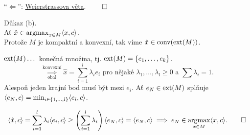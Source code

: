 \enquote{$\Leftarrow$}: \href{https://cs.wikipedia.org/wiki/Weierstrassova_v%C4%9Bta}{Weierstrassova věta}. $\qed$

Důkaz (b). \\ Ať $\hat x \in \operatorname*{argmax}_{x \in M} \langle x,c\rangle$. \\
Protože $M$ je kompaktní a konvexní, tak víme $\hat x \in \operatorname*{conv}(\operatorname*{ext}(M))$.

$\operatorname*{ext}(M) \dots$ konečná množina, tj. $\operatorname*{ext}(M) = \left\lbrace e_1, \dots, e_k \right\rbrace$.
\[
    \underset{\text{obal}}{\overset{\text{konvexní}}{\implies}} \hat x = \sum_{i=1}^{l} \lambda_i e_i \text{ pro nějaké }
    \lambda_1, \dots, \lambda_l \geq 0 \text{ a } \sum \lambda_i = 1.
\]
Alespoň jeden krajní bod musí být mezi $e_i$. 
Ať $e_N \in \operatorname*{ext}(M)$ splňuje $\langle e_N, c\rangle = \min_{i \in \left\lbrace 1, \dots, l \right\rbrace} \langle e_i, c\rangle$.

\[
    \langle \hat x, c\rangle = \sum_{i=1}^{l} \lambda_i \langle e_i, c\rangle \geq \left(\sum_{i=1}^{l} \lambda_i\right)
    \langle e_N, c\rangle = \langle e_N, c\rangle \implies e_N \in \operatorname*{argmax}_{x \in M} \langle x, c\rangle. \qed
\]

